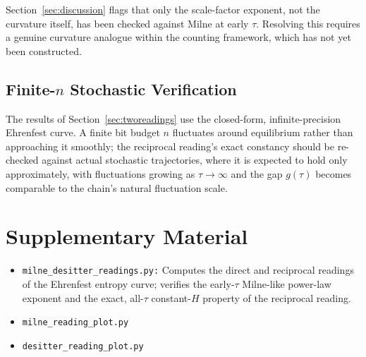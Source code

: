 \documentclass[11pt]{article}
\begin{document}
Section~\ref{sec:discussion} flags that only the scale-factor exponent,
not the curvature itself, has been checked against Milne at early
$\tau$. Resolving this requires a genuine curvature analogue within the
counting framework, which has not yet been constructed.

\subsection*{Finite-$n$ Stochastic Verification}

The results of Section~\ref{sec:tworeadings} use the closed-form,
infinite-precision Ehrenfest curve. A finite bit budget $n$ fluctuates
around equilibrium rather than approaching it smoothly; the reciprocal
reading's exact constancy should be re-checked against actual stochastic
trajectories, where it is expected to hold only approximately, with
fluctuations growing as $\tau\to\infty$ and the gap $g(\tau)$ becomes
comparable to the chain's natural fluctuation scale.


\section*{Supplementary Material}
\label{sec:supplementary}

\begin{itemize}
\item \texttt{milne\_desitter\_readings.py:} Computes the direct and
  reciprocal readings of the Ehrenfest entropy curve; verifies the
  early-$\tau$ Milne-like power-law exponent and the exact,
  all-$\tau$ constant-$H$ property of the reciprocal reading.
\item \texttt{milne\_reading\_plot.py} 
\item \texttt{desitter\_reading\_plot.py} 
\end{itemize}

\printbibliography
\end{document}
